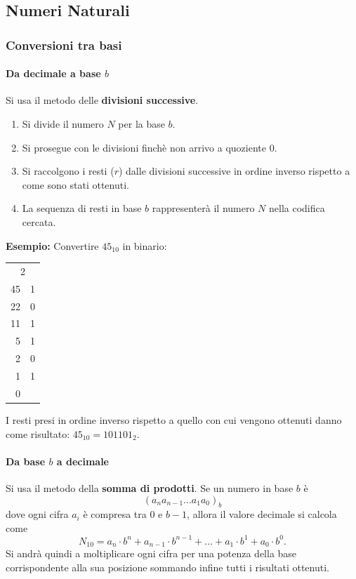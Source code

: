 \documentclass[oneside]{scrbook}
\begin{document}
\subsection{Numeri Naturali}

\subsubsection{Conversioni tra basi}
\paragraph{Da decimale a base $b$}
Si usa il metodo delle \textbf{divisioni successive}.
\begin{enumerate}
    \item Si divide il numero $N$ per la base $b$.
    \item Si prosegue con le divisioni finchè non arrivo a quoziente $0$.
    \item Si raccolgono i resti ($r$) dalle divisioni successive in ordine inverso rispetto a come sono stati ottenuti.
    \item La sequenza di resti in base $b$ rappresenterà il numero $N$ nella codifica cercata.
\end{enumerate}

\textbf{Esempio:}  
Convertire $45_{10}$ in binario:

\begin{center}
\begin{tabular}{r|r}
    \multicolumn{2}{c}{2} \\
    45 & 1 \\
    22 & 0 \\
    11 & 1 \\
    5 & 1 \\
    2 & 0 \\
    1 & 1 \\
    0 &
\end{tabular}
\end{center}

I resti presi in ordine inverso rispetto a quello con cui vengono ottenuti danno come risultato: $45_{10} = 101101_2$.


\paragraph{Da base $b$ a decimale}
Si usa il metodo della \textbf{somma di prodotti}. Se un numero in base $b$ è
$$
    (a_n a_{n-1}...a_1 a_0)_b
$$
dove ogni cifra $a_i$ è compresa tra 0 e $b-1$, allora il valore decimale si calcola come
$$
    N_{10} = a_n \cdot b^n + a_{n-1} \cdot b^{n-1} +...+a_1 \cdot b^1 +a_0 \cdot b^0.
$$
Si andrà quindi a moltiplicare ogni cifra per una potenza della base corrispondente alla sua posizione sommando infine tutti i risultati ottenuti.
\end{document}
